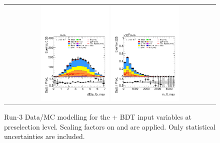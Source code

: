 \begin{figure}[htbp]
\begin{tabular}{@{}c c c@{}}
    \\[4pt]
    \multicolumn{3}{c}{%
      \includegraphics[width=0.33\textwidth]{images/plots_modelling_run2_run3_variables/run_3_tth/plot_dEta_lb_max_hh_tth_22_23_24.pdf}%
      \hspace{1.5pt}%
      \includegraphics[width=0.33\textwidth]{images/plots_modelling_run2_run3_variables/run_3_tth/plot_m_ll_max_hh_tth_22_23_24.pdf}%
    }\\
  \end{tabular}

  \caption{Run-3 Data/MC modelling for the \thqb + \ttH BDT input variables at preselection level. Scaling factors on \ztautau and \ttbar are applied. Only statistical uncertainties are included.}
  \label{tth_vars_modelling_run3_3}
\end{figure}




